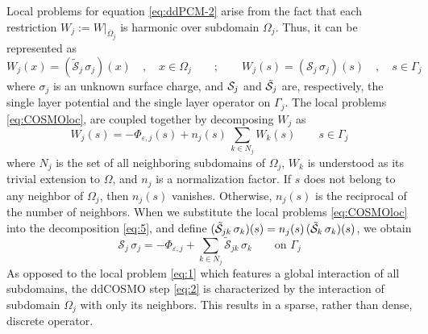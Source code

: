Local problems for equation \eqref{eq:ddPCM-2} arise from the fact that each restriction $W_j := W |_{\overline{\Omega}_j}$ is harmonic over subdomain $\Omega_j$. Thus, it can be represented as 
\begin{equation}\label{eq:COSMOloc}
W_j(x) = (\tilde{\mathcal{S}}_j \,  \sigma_j) (x) \quad , \quad x \in \Omega_j \qquad ; \qquad
W_j(s) = (\mathcal{S}_j \,  \sigma_j) (s) \quad , \quad s \in \Gamma_j
\end{equation}
where $\sigma_j$ is an unknown surface charge, and $\mathcal{S}_j$ and $\tilde{\mathcal{S}}_j$ are, respectively, the single layer potential and the single layer operator on $\Gamma_j$. The local problems \eqref{eq:COSMOloc}, are coupled together by decomposing $W_j$ as
\begin{equation}\label{eq:5}
W_j(s) = - \Phi_{\varepsilon,j}(s) +  n_j(s) \, \sum_{k \in N_j} {W}_k(s) \qquad s \in \Gamma_j
\end{equation}
where $N_j$ is the set of all neighboring subdomains of $\Omega_j$, $W_k$ is understood as its trivial extension to $\Omega$, and $n_j$ is a normalization factor. If $s$ does not belong to any neighbor of $\Omega_j$, then $n_j(s)$ vanishes. Otherwise, $n_j(s)$ is the reciprocal of the number of neighbors. When we substitute the local problems \eqref{eq:COSMOloc} into the decomposition \eqref{eq:5}, and define $(\tilde{\mathcal{S}}_{jk} \, \sigma_k) (s) = n_j(s) \, (\tilde{\mathcal{S}}_k \, \sigma_k)(s)$, we obtain
\begin{equation}\label{eq:2}
\mathcal{S}_j \, \sigma_j  = -\Phi_{\varepsilon,j} +  \sum_{k \in N_j} \tilde{\mathcal{S}}_{jk} \, \sigma_k \qquad \text{on } \Gamma_j
\end{equation}
As opposed to the local problem \eqref{eq:1} which features a global interaction of all subdomains, the ddCOSMO step \eqref{eq:2} is characterized by the interaction of subdomain $\Omega_j$ with only its neighbors. This results in a sparse, rather than dense, discrete operator.

